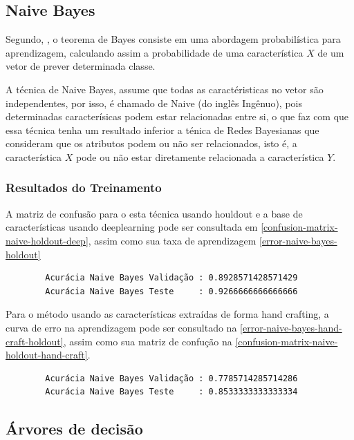 \documentclass[
article,			%
11pt,				%
oneside,			%
a4paper,			%
english,			%
brazil,				%
sumario=tradicional,
]{abntex2}
\begin{document}
	\subsection{Naive Bayes}
	
	Segundo, , o teorema de Bayes consiste em uma abordagem probabilística para aprendizagem, calculando assim a probabilidade de uma característica \(X\) de um vetor de prever determinada classe.
	
	A técnica de Naive Bayes, assume que todas as caractéristicas no vetor são independentes, por isso, é chamado de Naive (do inglês Ingênuo), pois determinadas caracterísicas podem estar relacionadas entre si, o que faz com que essa técnica tenha um resultado inferior a ténica de Redes Bayesianas que consideram que os atributos podem ou não ser relacionados, isto é, a característica \(X\) pode ou não estar diretamente relacionada a característica \(Y\).
	
	\subsubsection{Resultados do Treinamento}
	
	A matriz de confusão para o esta técnica usando houldout e a base de características usando deeplearning pode ser consultada em \autoref{confusion-matrix-naive-holdout-deep}, assim como sua taxa de aprendizagem \autoref{error-naive-bayes-holdout}
	
	\begin{verbatim}
		Acurácia Naive Bayes Validação : 0.8928571428571429
		Acurácia Naive Bayes Teste     : 0.9266666666666666
	\end{verbatim}
	
	Para o método usando as características extraídas de forma hand crafting, a curva de erro na aprendizagem pode ser consultado na \autoref{error-naive-bayes-hand-craft-holdout}, assim como sua matriz de confução na \autoref{confusion-matrix-naive-holdout-hand-craft}.
	
	\begin{verbatim}
		Acurácia Naive Bayes Validação : 0.7785714285714286
		Acurácia Naive Bayes Teste     : 0.8533333333333334
	\end{verbatim}
	
	\subsection{Árvores de decisão}
	
\end{document}
